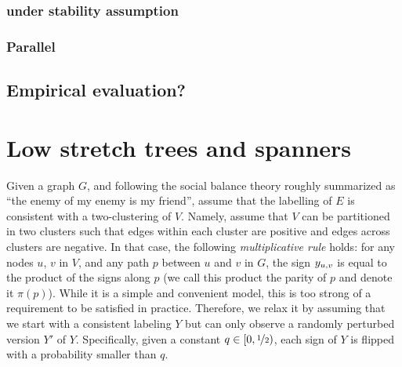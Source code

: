 \documentclass[nobib, a4paper, 10pt, oneside, onecolumn, openany, notitlepage, final,
svgnames, marginals=raggedouter, english,
]{article}
\begin{document}
\subsubsection{\pcc{} under stability assumption}
\label{ssub:cc_under_stability_assumption}

\iffalse
Haris Angelidakis, Konstantin Makarychev, and Yury Makarychev. 2017.
Algorithms for Stable and Perturbation-Resilient Problems. STOC’17
\href{http://ttic.uchicago.edu/~yury/papers/two-stable.pdf}{10.1145/3055399.3055487}
improves over the one cited in the internship description
\fi

\subsubsection{Parallel \pcc{}}
\label{ssub:parallel_cc}

\subsection{Empirical evaluation?}
\label{sub:cc_empiracal_evaluation}

\newpage

\section{Low stretch trees and spanners}
\label{sec:low_stretch_trees_and_spanners}



Given a graph $G$, and following the social balance theory roughly summarized as \enquote{the enemy
of my enemy is my friend}, assume that the labelling of $E$ is consistent with a two-clustering of
$V$. Namely, assume that $V$ can be partitioned in two clusters such that edges within each cluster
are positive and edges across clusters are negative. In that case, the following
\emph{multiplicative rule} holds: for any nodes $u$, $v$ in $V$, and any path $p$ between $u$ and
$v$ in $G$, the sign $y_{u, v}$ is equal to the product of the signs along $p$ (we call this product the
parity of $p$ and denote it $\pi(p)$). While it is a simple and convenient model, this is too strong
of a requirement to be satisfied in practice. Therefore, we relax it by assuming that we start with
a consistent labeling $Y$ but can only observe a randomly perturbed version $Y'$ of $Y$.
Specifically, given a constant $q\in [0, \nicefrac{1}{2})$, each sign of $Y$ is flipped with a
probability smaller than $q$.
\end{document}
